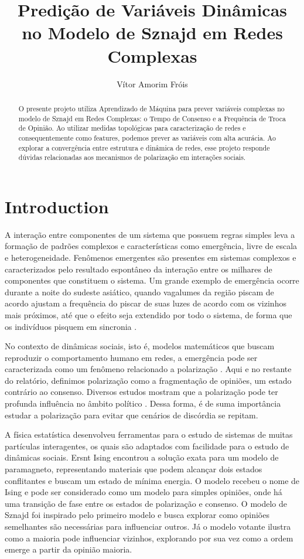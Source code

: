 \documentclass{article}
\title{Predição de Variáveis Dinâmicas no Modelo de Sznajd em Redes Complexas}
\author{Vítor Amorim Fróis}
\begin{document}
\maketitle

\begin{abstract}
    O presente projeto utiliza Aprendizado de Máquina para prever variáveis complexas no modelo de Sznajd em Redes Complexas: o Tempo de Consenso e a Frequência de Troca de Opinião. Ao utilizar medidas topológicas para caracterização de redes e consequentemente como features, podemos prever as variáveis com alta acurácia.
    Ao explorar a convergência entre estrutura e dinâmica de redes, esse projeto responde dúvidas relacionadas aos mecanismos de polarização em interações sociais.
\end{abstract}

\section{Introduction}
A interação entre componentes de um sistema que possuem regras simples leva a formação de padrões complexos e características como emergência, livre de escala e heterogeneidade. Fenômenos emergentes são presentes em sistemas complexos e caracterizados pelo resultado espontâneo da interação entre os milhares de componentes que constituem o sistema. Um grande exemplo de emergência ocorre durante a noite do sudeste asiático, quando vagalumes da região piscam de acordo ajustam a frequência do piscar de suas luzes de acordo com os vizinhos mais próximos, até que o efeito seja extendido por todo o sistema, de forma que os indivíduos pisquem em sincronia \cite{johnson2002emergence}.

No contexto de dinâmicas sociais, isto é, modelos matemáticos que buscam reproduzir o comportamento humano em redes, a emergência pode ser caracterizada como um fenômeno relacionado a polarização \cite{maia2021emergence}. Aqui e no restante do relatório, definimos polarização como a fragmentação de opiniões, um estado contrário ao consenso. Diversos estudos mostram que a polarização pode ter profunda influência no âmbito político \cite{interian2023polarization,layton2021polarization}. Dessa forma, é de suma importância estudar a polarização para evitar que cenários de discórdia se repitam.

A física estatística desenvolveu ferramentas para o estudo de sistemas de muitas partículas interagentes, os quais são adaptados com facilidade para o estudo de dinâmicas sociais. Ersnt Ising encontrou a solução exata para um modelo de paramagneto, representando materiais que podem alcançar dois estados conflitantes e buscam um estado de mínima energia. O modelo recebeu o nome de Ising e pode ser considerado como um modelo para simples opiniões, onde há uma transição de fase entre os estados de polarização e consenso. O modelo de Sznajd foi inspirado pelo primeiro modelo e busca explorar como opiniões semelhantes são necessárias para influenciar outros. Já o modelo votante ilustra como a maioria pode influenciar vizinhos, explorando por sua vez como a ordem emerge a partir da opinião maioria.
\end{document}
